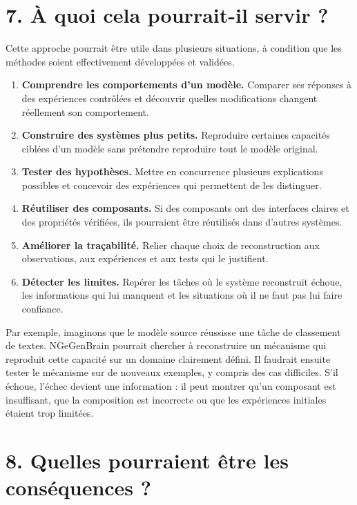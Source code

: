 \documentclass[11pt,a4paper]{article}
\begin{document}
\section*{7. À quoi cela pourrait-il servir ?}

Cette approche pourrait être utile dans plusieurs situations, à condition que les méthodes soient effectivement développées et validées.

\begin{enumerate}[leftmargin=1.6em]
  \item \textbf{Comprendre les comportements d'un modèle.} Comparer ses réponses à des expériences contrôlées et découvrir quelles modifications changent réellement son comportement.
  \item \textbf{Construire des systèmes plus petits.} Reproduire certaines capacités ciblées d'un modèle sans prétendre reproduire tout le modèle original.
  \item \textbf{Tester des hypothèses.} Mettre en concurrence plusieurs explications possibles et concevoir des expériences qui permettent de les distinguer.
  \item \textbf{Réutiliser des composants.} Si des composants ont des interfaces claires et des propriétés vérifiées, ils pourraient être réutilisés dans d'autres systèmes.
  \item \textbf{Améliorer la traçabilité.} Relier chaque choix de reconstruction aux observations, aux expériences et aux tests qui le justifient.
  \item \textbf{Détecter les limites.} Repérer les tâches où le système reconstruit échoue, les informations qui lui manquent et les situations où il ne faut pas lui faire confiance.
\end{enumerate}

Par exemple, imaginons que le modèle source réussisse une tâche de classement de textes. NGeGenBrain pourrait chercher à reconstruire un mécanisme qui reproduit cette capacité sur un domaine clairement défini. Il faudrait ensuite tester le mécanisme sur de nouveaux exemples, y compris des cas difficiles. S'il échoue, l'échec devient une information : il peut montrer qu'un composant est insuffisant, que la composition est incorrecte ou que les expériences initiales étaient trop limitées.

\section*{8. Quelles pourraient être les conséquences ?}
\end{document}
